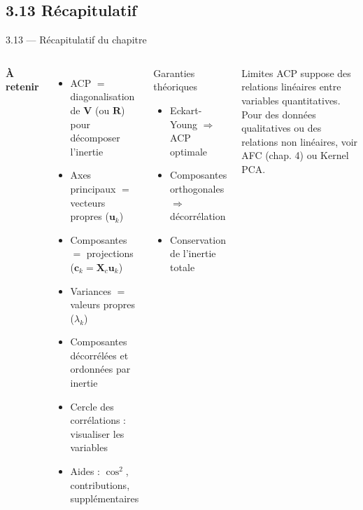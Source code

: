 \subsection{3.13 Récapitulatif}
\begin{frame}{3.13 — Récapitulatif du chapitre}
\begin{columns}[T]
\textbf{À retenir}
\begin{itemize}\small
  \item ACP $=$ diagonalisation de $\mathbf{V}$ (ou $\mathbf{R}$) pour
        décomposer l'inertie
  \item Axes principaux $=$ vecteurs propres ($\mathbf{u}_k$)
  \item Composantes $=$ projections ($\mathbf{c}_k = \mathbf{X}_c \mathbf{u}_k$)
  \item Variances $=$ valeurs propres ($\lambda_k$)
  \item Composantes décorrélées et ordonnées par inertie
  \item Cercle des corrélations : visualiser les variables
  \item Aides : $\cos^2$, contributions, supplémentaires
\end{itemize}

\begin{block}{Garanties théoriques}
\begin{itemize}\small
  \item Eckart-Young $\Rightarrow$ ACP optimale
  \item Composantes orthogonales $\Rightarrow$ décorrélation
  \item Conservation de l'inertie totale
\end{itemize}
\end{block}

\begin{alertblock}{Limites}
\small ACP suppose des relations \alert{linéaires} entre variables
quantitatives. Pour des données qualitatives ou des relations
non linéaires, voir AFC (chap. 4) ou Kernel PCA.
\end{alertblock}
\end{columns}
\end{frame}
